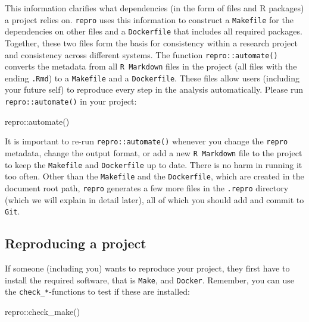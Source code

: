\documentclass[psych,tutorial,submit,moreauthors,pdftex]{mdpi}
\newenvironment{Shaded}{\begin{snugshade}}{\end{snugshade}}
\newcommand{\FunctionTok}[1]{\textcolor[rgb]{0.00,0.00,0.00}{#1}}
\newcommand{\NormalTok}[1]{#1}
\newcommand{\SpecialCharTok}[1]{\textcolor[rgb]{0.00,0.00,0.00}{#1}}
\begin{document}
This information clarifies what dependencies (in the form of files and R
packages) a project relies on. \texttt{repro} uses this information to
construct a \texttt{Makefile} for the dependencies on other files and a
\texttt{Dockerfile} that includes all required packages. Together, these
two files form the basis for consistency within a research project and
consistency across different systems. The function
\texttt{repro::automate()} converts the metadata from all
\texttt{R\ Markdown} files in the project (all files with the ending
\texttt{.Rmd}) to a \texttt{Makefile} and a \texttt{Dockerfile}. These
files allow users (including your future self) to reproduce every step
in the analysis automatically. Please run \texttt{repro::automate()} in
your project:

\begin{Shaded}
\begin{Highlighting}[]
\NormalTok{repro}\SpecialCharTok{::}\FunctionTok{automate}\NormalTok{()}
\end{Highlighting}
\end{Shaded}

It is important to re-run \texttt{repro::automate()} whenever you change
the \texttt{repro} metadata, change the output format, or add a new
\texttt{R\ Markdown} file to the project to keep the \texttt{Makefile}
and \texttt{Dockerfile} up to date. There is no harm in running it too
often. Other than the \texttt{Makefile} and the \texttt{Dockerfile},
which are created in the document root path, \texttt{repro} generates a
few more files in the \texttt{.repro} directory (which we will explain
in detail later), all of which you should add and commit to
\texttt{Git}.

\hypertarget{reproducing-a-project}{%
\subsection{Reproducing a project}\label{reproducing-a-project}}

If someone (including you) wants to reproduce your project, they first
have to install the required software, that is \texttt{Make}, and
\texttt{Docker}. Remember, you can use the \texttt{check\_*}-functions
to test if these are installed:

\begin{Shaded}
\begin{Highlighting}[]
\NormalTok{repro}\SpecialCharTok{::}\FunctionTok{check\_make}\NormalTok{()}
\end{Highlighting}
\end{Shaded}
\end{document}
